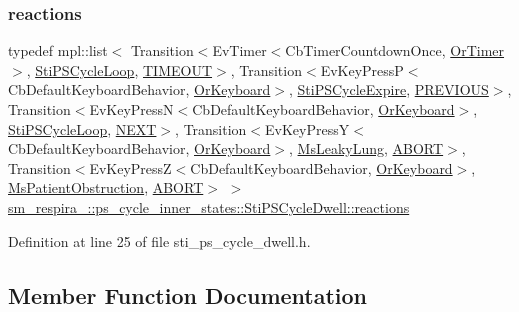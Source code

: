 \subsubsection{\texorpdfstring{reactions}{reactions}}
{\footnotesize\ttfamily typedef mpl\+::list$<$ Transition$<$Ev\+Timer$<$Cb\+Timer\+Countdown\+Once, \hyperlink{classsm__respira__1_1_1OrTimer}{Or\+Timer}$>$, \hyperlink{structsm__respira__1_1_1ps__cycle__inner__states_1_1StiPSCycleLoop}{Sti\+P\+S\+Cycle\+Loop}, \hyperlink{structsm__respira__1_1_1ps__cycle__inner__states_1_1StiPSCycleDwell_1_1TIMEOUT}{T\+I\+M\+E\+O\+UT}$>$, Transition$<$Ev\+Key\+PressP$<$Cb\+Default\+Keyboard\+Behavior, \hyperlink{classsm__respira__1_1_1OrKeyboard}{Or\+Keyboard}$>$, \hyperlink{structsm__respira__1_1_1ps__cycle__inner__states_1_1StiPSCycleExpire}{Sti\+P\+S\+Cycle\+Expire}, \hyperlink{structsm__respira__1_1_1ps__cycle__inner__states_1_1StiPSCycleDwell_1_1PREVIOUS}{P\+R\+E\+V\+I\+O\+US}$>$, Transition$<$Ev\+Key\+PressN$<$Cb\+Default\+Keyboard\+Behavior, \hyperlink{classsm__respira__1_1_1OrKeyboard}{Or\+Keyboard}$>$, \hyperlink{structsm__respira__1_1_1ps__cycle__inner__states_1_1StiPSCycleLoop}{Sti\+P\+S\+Cycle\+Loop}, \hyperlink{structsm__respira__1_1_1ps__cycle__inner__states_1_1StiPSCycleDwell_1_1NEXT}{N\+E\+XT}$>$, Transition$<$Ev\+Key\+PressY$<$Cb\+Default\+Keyboard\+Behavior, \hyperlink{classsm__respira__1_1_1OrKeyboard}{Or\+Keyboard}$>$, \hyperlink{classsm__respira__1_1_1MsLeakyLung}{Ms\+Leaky\+Lung}, \hyperlink{classABORT}{A\+B\+O\+RT}$>$, Transition$<$Ev\+Key\+PressZ$<$Cb\+Default\+Keyboard\+Behavior, \hyperlink{classsm__respira__1_1_1OrKeyboard}{Or\+Keyboard}$>$, \hyperlink{classsm__respira__1_1_1MsPatientObstruction}{Ms\+Patient\+Obstruction}, \hyperlink{classABORT}{A\+B\+O\+RT}$>$ $>$ \hyperlink{structsm__respira__1_1_1ps__cycle__inner__states_1_1StiPSCycleDwell_a71868ecd28a6aa6501a318a72207c2b5}{sm\+\_\+respira\+\_\+::ps\+\_\+cycle\+\_\+inner\+\_\+states\+::\+Sti\+P\+S\+Cycle\+Dwell\+::reactions}}



Definition at line 25 of file sti\+\_\+ps\+\_\+cycle\+\_\+dwell.\+h.



\subsection{Member Function Documentation}
\mbox{\label{structsm__respira__1_1_1ps__cycle__inner__states_1_1StiPSCycleDwell_add9409472c890208afc0e0c358e0fa9c}} 
